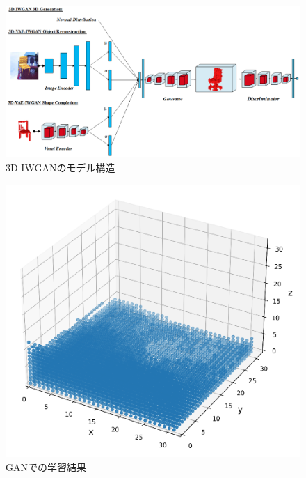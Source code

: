 \documentclass[uplatex,twocolumn, dvipdfmx]{jsarticle}  %
\begin{document}
\begin{figure}[b]
  \begin{center}
   \includegraphics[width=1.0\linewidth]{images/3d_gan.png}
   \caption{3D-IWGANのモデル構造}
   \label{fig:3d_gan}
  \end{center}
\end{figure}

\begin{figure}[b]
  \begin{center}
   \includegraphics[width=0.6\linewidth]{images/voxel.png}
   \caption{GANでの学習結果}
   \label{fig:voxel}
  \end{center}
\end{figure}
\end{document}
